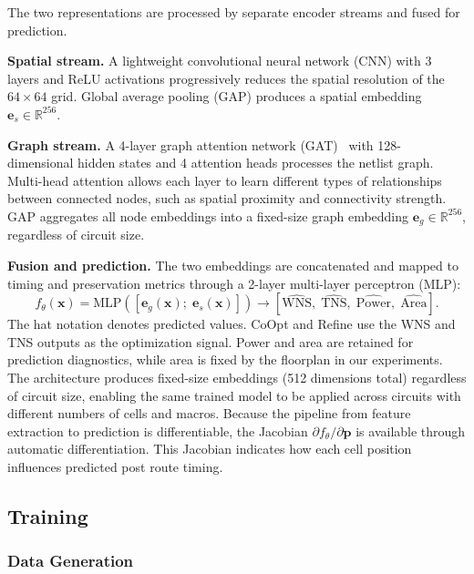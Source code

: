 \documentclass[sigconf,anonymous,review,9pt]{acmart}
\begin{document}
The two representations are processed by separate encoder streams and
fused for prediction.

\textbf{Spatial stream.} A lightweight convolutional neural network (CNN) with 3 layers
and ReLU activations progressively reduces the spatial
resolution of the $64 \times 64$ grid. Global average
pooling (GAP) produces
a spatial embedding $\mathbf{e}_s \in \mathbb{R}^{256}$.

\textbf{Graph stream.} A 4-layer graph attention network
(GAT)~\cite{gat2018} with 128-dimensional hidden states and 4
attention heads processes the netlist graph. Multi-head attention allows
each layer to learn different types of relationships between connected
nodes, such as spatial proximity and connectivity strength. GAP aggregates all node embeddings into a fixed-size graph embedding
$\mathbf{e}_g \in \mathbb{R}^{256}$, regardless of circuit size.

\textbf{Fusion and prediction.} The two embeddings are concatenated and
mapped to timing and preservation metrics through a 2-layer multi-layer
perceptron (MLP):
\begin{equation}
\label{eq:predictor}
f_\theta(\mathbf{x}) =
\mathrm{MLP}\!\left([\mathbf{e}_g(\mathbf{x});\;
\mathbf{e}_s(\mathbf{x})]\right) \rightarrow
[\widehat{\mathrm{WNS}},\; \widehat{\mathrm{TNS}},\;
\widehat{\mathrm{Power}},\; \widehat{\mathrm{Area}}].
\end{equation}
The hat notation denotes predicted values. CoOpt and Refine use the WNS
and TNS outputs as the optimization signal. Power and area are retained
for prediction diagnostics, while area is fixed by the floorplan in our
experiments. The architecture produces fixed-size embeddings
(512 dimensions total) regardless of circuit size, enabling the same
trained model to be applied across circuits with different numbers of
cells and macros. Because the pipeline from feature extraction to
prediction is differentiable, the Jacobian
$\partial f_\theta / \partial \mathbf{p}$ is available through automatic
differentiation. This Jacobian indicates how each cell position
influences predicted post route timing.


\subsection{Training}
\label{subsec:training}

\subsubsection{Data Generation}
\end{document}
